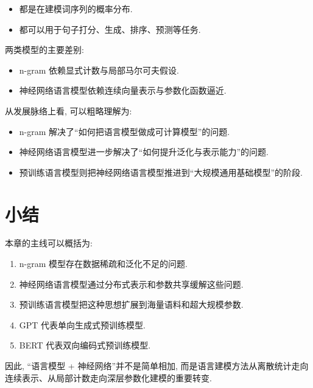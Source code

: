 \begin{itemize}
\item 都是在建模词序列的概率分布.
\item 都可以用于句子打分、生成、排序、预测等任务.
\end{itemize}

两类模型的主要差别:

\begin{itemize}
\item n-gram 依赖显式计数与局部马尔可夫假设.
\item 神经网络语言模型依赖连续向量表示与参数化函数逼近.
\end{itemize}

从发展脉络上看, 可以粗略理解为:

\begin{itemize}
\item n-gram 解决了“如何把语言模型做成可计算模型”的问题.
\item 神经网络语言模型进一步解决了“如何提升泛化与表示能力”的问题.
\item 预训练语言模型则把神经网络语言模型推进到“大规模通用基础模型”的阶段.
\end{itemize}

\section{小结}


本章的主线可以概括为:

\begin{enumerate}
\item[1.] n-gram 模型存在数据稀疏和泛化不足的问题.
\item[2.] 神经网络语言模型通过分布式表示和参数共享缓解这些问题.
\item[3.] 预训练语言模型把这种思想扩展到海量语料和超大规模参数.
\item[4.] GPT 代表单向生成式预训练模型.
\item[5.] BERT 代表双向编码式预训练模型.
\end{enumerate}

因此, “语言模型 + 神经网络”并不是简单相加,
而是语言建模方法从离散统计走向连续表示、从局部计数走向深层参数化建模的重要转变.
